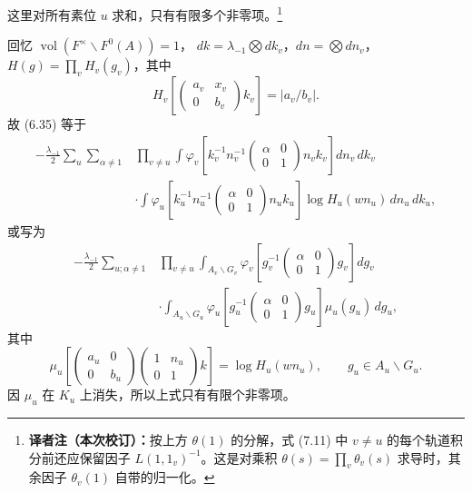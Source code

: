 这里对所有素位 $u$ 求和，只有有限多个非零项。\footnote{\textbf{译者注（本次校订）：}按上方 $\theta(1)$ 的分解，式 (7.11) 中 $v\ne u$ 的每个轨道积分前还应保留因子 $L(1,1_v)^{-1}$。这是对乘积 $\theta(s)=\prod_v\theta_v(s)$ 求导时，其余因子 $\theta_v(1)$ 自带的归一化。}

回忆 $\operatorname{vol}(F^\times\backslash F^0(A))=1$，
$dk=\lambda_{-1}\bigotimes dk_v$，$dn=\bigotimes dn_v$，
$H(g)=\prod_vH_v(g_v)$，其中
\[
 H_v\!\left[\begin{pmatrix}a_v&x_v\\0&b_v\end{pmatrix}k_v\right]=|a_v/b_v|.
\]
故 (6.35) 等于
\[
\begin{split}
 -\frac{\lambda_{-1}}2\sum_u\sum_{\alpha\ne1}
 &\prod_{v\ne u}\int\varphi_v\!\left[k_v^{-1}n_v^{-1}
 \begin{pmatrix}\alpha&0\\0&1\end{pmatrix}n_vk_v\right]dn_v\,dk_v\\
 &\cdot\int\varphi_u\!\left[k_u^{-1}n_u^{-1}
 \begin{pmatrix}\alpha&0\\0&1\end{pmatrix}n_uk_u\right]\log H_u(wn_u)\,dn_u\,dk_u,
\end{split}
\]
或写为
\begin{equation}
\begin{split}
 -\frac{\lambda_{-1}}2\sum_{u;\alpha\ne1}
 &\prod_{v\ne u}\int_{A_v\backslash G_v}
 \varphi_v\!\left[g_v^{-1}\begin{pmatrix}\alpha&0\\0&1\end{pmatrix}g_v\right]dg_v\\
 &\cdot\int_{A_u\backslash G_u}\varphi_u\!\left[g_u^{-1}
 \begin{pmatrix}\alpha&0\\0&1\end{pmatrix}g_u\right]\mu_u(g_u)\,dg_u,
\end{split}\tag{7.12}
\end{equation}
其中
\[
 \mu_u\!\left[\begin{pmatrix}a_u&0\\0&b_u\end{pmatrix}
 \begin{pmatrix}1&n_u\\0&1\end{pmatrix}k\right]=\log H_u(wn_u),
 \qquad g_u\in A_u\backslash G_u.
\]
因 $\mu_u$ 在 $K_u$ 上消失，所以上式只有有限个非零项。

